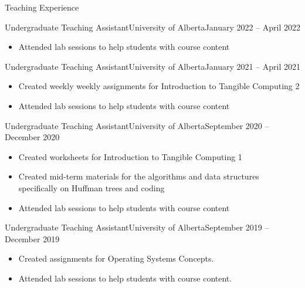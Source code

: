 \documentclass[]{mcdowellcv}
\begin{document}
\vspace*{-10pt}
\begin{cvsection}{Teaching Experience}
  \begin{cvsubsection}{Undergraduate Teaching Assistant}{University of Alberta}{January 2022 -- April 2022}	
    \vspace*{8pt}
    \begin{itemize}
      \item Attended lab sessions to help students with course content
    \end{itemize}
  \end{cvsubsection}

  \begin{cvsubsection}{Undergraduate Teaching Assistant}{University of Alberta}{January 2021 -- April 2021}	
    \vspace*{8pt}
    \begin{itemize}
      \item Created weekly weekly assignments for Introduction to Tangible Computing 2 
      \item Attended lab sessions to help students with course content
    \end{itemize}
  \end{cvsubsection}

  \begin{cvsubsection}{Undergraduate Teaching Assistant}{University of Alberta}{September 2020 -- December 2020}	
    \vspace*{8pt}
    \begin{itemize}
      \item Created worksheets for Introduction to Tangible Computing 1 
      \item Created mid-term materials for the algorithms and data structures specifically on Huffman trees and coding 
      \item Attended lab sessions to help students with course content
    \end{itemize}
  \end{cvsubsection}
  
  \begin{cvsubsection}{Undergraduate Teaching Assistant}{University of Alberta}{September 2019 -- December 2019}	
    \vspace*{8pt}
    \begin{itemize}
      \item Created assignments for Operating Systems Concepts. 
      \item Attended lab sessions to help students with course content.
    \end{itemize}
  \end{cvsubsection}
  
\end{cvsection}
\end{document}
